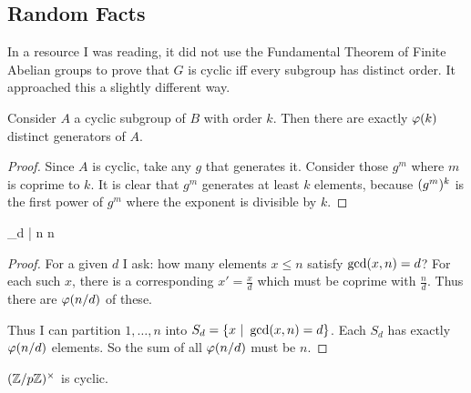 \subsection{Random Facts}

\begin{remark}
  In a resource I was reading, it did not use the Fundamental Theorem of
  Finite Abelian groups to prove that $G$ is cyclic iff every subgroup
  has distinct order. It approached this a slightly different way.
\end{remark}

\begin{lemma}
  Consider $A$ a cyclic subgroup of $B$ with order $k$. Then there are
  exactly $\varphi\mathopen{}\left( {k} \right)\mathclose{}$ distinct generators of $A$.
\end{lemma}

\begin{proof}
  Since $A$ is cyclic, take any $g$ that generates it. Consider those
  $g^m$ where $m$ is coprime to $k$. It is clear that $g^m$ generates at
  least $k$ elements, because $\mathopen{}\left( {g^m} \right)\mathclose{}^k$ is the first power of
  $g^m$ where the exponent is divisible by $k$.
\end{proof}

\begin{lemma}
  \begin{nedqn}
    \sum_{d | n} 
  \eqcol
    n
  \end{nedqn}
\end{lemma}

\begin{proof}
  For a given $d$ I ask: how many elements $x \leq n$ satisfy $\gcd\mathopen{}\left( {x,
  n} \right)\mathclose{} = d$? For each such $x$, there is a corresponding $x' =
  \frac{x}{d}$ which must be coprime with $\frac{n}{d}$. Thus there are
  $\varphi\mathopen{}\left( {n/d} \right)\mathclose{}$ of these.

  Thus I can partition $1, \ldots, n$ into $S_d = \left\{ x\ |\ \gcd\mathopen{}\left( {x,
  n} \right)\mathclose{} = d \right\}$. Each $S_d$ has exactly $\varphi\mathopen{}\left( {n/d} \right)\mathclose{}$ elements. So the sum of
  all $\varphi\mathopen{}\left( {n/d} \right)\mathclose{}$ must be $n$.
\end{proof}

\begin{theorem}
  $\mathopen{}\left( {\mathbb{Z} / p\mathbb{Z}} \right)\mathclose{}^\times$ is cyclic.
\end{theorem}

